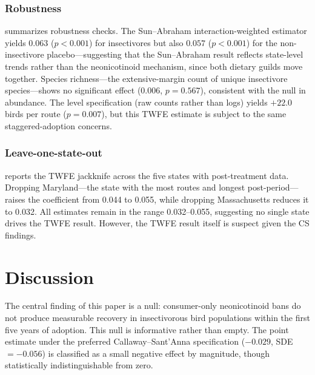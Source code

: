 \documentclass[12pt]{article}
\begin{document}
\subsubsection*{Robustness}  summarizes robustness checks. The Sun--Abraham interaction-weighted estimator \citep{sun2021estimating} yields $0.063$ ($p < 0.001$) for insectivores but also $0.057$ ($p < 0.001$) for the non-insectivore placebo---suggesting that the Sun--Abraham result reflects state-level trends rather than the neonicotinoid mechanism, since both dietary guilds move together. Species richness---the extensive-margin count of unique insectivore species---shows no significant effect ($0.006$, $p = 0.567$), consistent with the null in abundance. The level specification (raw counts rather than logs) yields $+22.0$ birds per route ($p = 0.007$), but this TWFE estimate is subject to the same staggered-adoption concerns.

\subsubsection*{Leave-one-state-out}  reports the TWFE jackknife across the five states with post-treatment data. Dropping Maryland---the state with the most routes and longest post-period---raises the coefficient from 0.044 to 0.055, while dropping Massachusetts reduces it to 0.032. All estimates remain in the range 0.032--0.055, suggesting no single state drives the TWFE result. However, the TWFE result itself is suspect given the CS findings.


\section{Discussion}

The central finding of this paper is a null: consumer-only neonicotinoid bans do not produce measurable recovery in insectivorous bird populations within the first five years of adoption. This null is informative rather than empty. The point estimate under the preferred Callaway--Sant'Anna specification ($-0.029$, SDE $= -0.056$) is classified as a small negative effect by magnitude, though statistically indistinguishable from zero.
\end{document}
